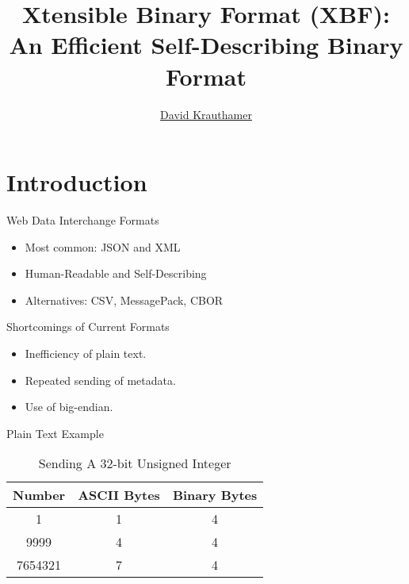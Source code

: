 \documentclass{beamer}
\title{Xtensible Binary Format (XBF): An Efficient Self-Describing Binary Format}
\author{\href{mailto:dkrautha@pm.me}{David Krauthamer}}
\begin{document}
\maketitle

\section{Introduction}

\begin{frame}{Web Data Interchange Formats}
	\begin{itemize}
		\item Most common: JSON and XML
		\item Human-Readable and Self-Describing
		\item Alternatives: CSV, MessagePack, CBOR
	\end{itemize}
\end{frame}

\begin{frame}{Shortcomings of Current Formats}
	\begin{itemize}
		\item Inefficiency of plain text.
		\item Repeated sending of metadata.
		\item Use of big-endian.
	\end{itemize}
\end{frame}

\begin{frame}[fragile]{Plain Text Example}
	\begin{table}
		\caption{Sending A 32-bit Unsigned Integer}
		\begin{center}
			\begin{tabular}{|c|c|c|}
				\hline
				\textbf{Number} & \textbf{ASCII Bytes} & \textbf{Binary Bytes} \\
				\hline
				1               & 1                    & 4                     \\
				9999            & 4                    & 4                     \\
				7654321         & 7                    & 4                     \\
				\hline
			\end{tabular}
		\end{center}
	\end{table}
\end{frame}
\end{document}
